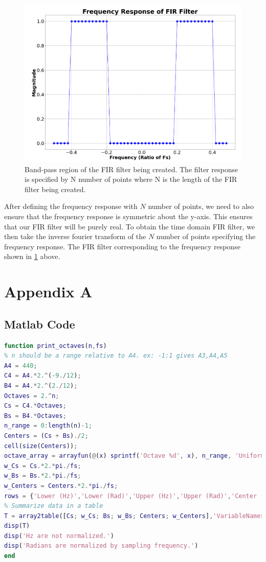 \documentclass[a4paper, 11pt]{exam}
\begin{document}
\newpage
\begin{figure}[h!]
  \centering
  \hspace*{-1.5cm}\includegraphics[width=17cm]{../images/define_freqs.png}
  \caption{Band-pass region of the FIR filter being created. The filter response is specified by N number of points where N is the length of the FIR filter being created.}
  \label{fig:define_freqs}
\end{figure}

After defining the frequency response with $N$ number of points, we need to also ensure that the frequency response is symmetric about the y-axis. This ensures that our FIR filter will be purely real. To obtain the time domain FIR filter, we then take the inverse fourier transform of the $N$ number of points specifying the frequency response. The FIR filter corresponding to the frequency response shown in \ref{fig:define_freqs} above.

\newpage
\section{Appendix A}
\subsection{Matlab Code}
\begin{lstlisting}[language=Matlab]
function print_octaves(n,fs)
% n should be a range relative to A4. ex: -1:1 gives A3,A4,A5
A4 = 440;
C4 = A4.*2.^(-9./12);
B4 = A4.*2.^(2./12);
Octaves = 2.^n;
Cs = C4.*Octaves;
Bs = B4.*Octaves;
n_range = 0:length(n)-1;
Centers = (Cs + Bs)./2;
cell(size(Centers));
octave_array = arrayfun(@(x) sprintf('Octave %d', x), n_range, 'UniformOutput', false);
w_Cs = Cs.*2.*pi./fs;
w_Bs = Bs.*2.*pi./fs;
w_Centers = Centers.*2.*pi./fs;
rows = {'Lower (Hz)','Lower (Rad)','Upper (Hz)','Upper (Rad)','Center (Hz)','Center (Rad)'};
% Summarize data in a table
T = array2table([Cs; w_Cs; Bs; w_Bs; Centers; w_Centers],'VariableNames',octave_array,'RowName',rows);
disp(T)
disp('Hz are not normalized.')
disp('Radians are normalized by sampling frequency.')
end 
\end{lstlisting}
\newpage
\end{document}
